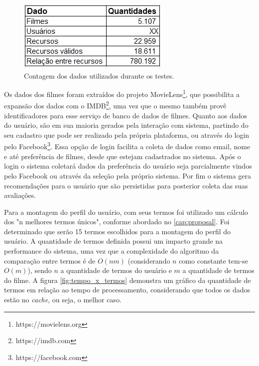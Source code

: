 \begin{figure}
	\centering
	\includegraphics[scale=0.8]{imagens/dataset.jpg}
	\caption{Contagem dos dados utilizados durante os testes.}
	\label{fig:dataset}
\end{figure}

Os dados dos filmes foram extraídos do projeto MovieLens\footnote{https://movielens.org}, que possibilita a expansão dos dados com o IMDB\footnote{https://imdb.com}, uma vez que o mesmo também provê identificadores para esse serviço de banco de dados de filmes. Quanto aos dados do usuário, são em sua maioria gerados pela interação com sistema, partindo do seu cadastro que pode ser realizado pela própria plataforma, ou através do login pelo Facebook\footnote{https://facebook.com}. Essa opção de login facilita a coleta de dados como email, nome e até preferência de filmes, desde que estejam cadastrados no sistema. Após o login o sistema coletará dados da preferência do usuário seja parcialmente vindos pelo Facebook ou através da seleção pela próprio sistema. Por fim o sistema gera recomendações para o usuário que são persistidas para posterior coleta das suas avaliações.

Para a montagem do perfil do usuário, com seus termos foi utilizado um cálculo dos "n melhores termos únicos", conforme abordado no \ref{cap:proposal}. Foi determinado que serão 15 termos escolhidos para a montagem do perfil do usuário. A quantidade de termos definida possui um impacto grande na performance do sistema, uma vez que a complexidade do algoritmo da comparação entre termos é de $O(nm)$ (considerando $n$ como constante tem-se $O(m)$), sendo $n$ a quantidade de termos do usuário e $m$ a quantidade de termos do filme. A figura \ref{fig:tempo_x_termos} demonstra um gráfico da quantidade de termos em relação ao tempo de processamento, considerando que todos os dados estão no \textit{cache}, ou seja, o melhor caso.


